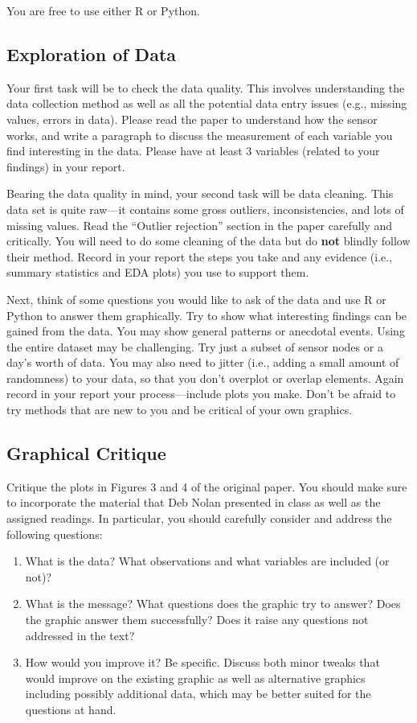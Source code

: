 \documentclass[11pt, oneside]{article}   	%
\begin{document}
You are free to use either R or Python.

\subsection*{Exploration of Data}

Your first task will be to check the data quality.  This involves understanding
the data collection method as well as all the potential data entry issues
(e.g., missing values, errors in data). Please read the paper to understand how
the sensor works, and write a paragraph to discuss the measurement of each
variable you find interesting in the data.  Please have at least 3 variables
(related to your findings) in your report.

Bearing the data quality in mind, your second task will be data cleaning. This
data set is quite raw---it contains some gross outliers, inconsistencies, and
lots of missing values. Read the ``Outlier rejection'' section in the paper
carefully and critically.  You will need to do some cleaning of the data but do
\textbf{not} blindly follow their method. Record in your report the steps you
take and any evidence (i.e., summary statistics and EDA plots) you use to
support them.

Next, think of some questions you would like to ask of the data and use R or
Python to answer them graphically. Try to show what interesting findings can be
gained from the data. You may show general patterns or anecdotal events.  Using
the entire dataset may be challenging. Try just a subset of sensor nodes or a
day's worth of data. You may also need to jitter (i.e., adding a small amount
of randomness) to your data, so that you don't overplot or overlap elements.
Again record in your report your process---include plots you make. Don't be
afraid to try methods that are new to you and be critical of your own graphics.

\subsection*{Graphical Critique}

Critique the plots in Figures 3 and 4 of the original paper. You should
make sure to incorporate the material that Deb Nolan presented in class as well
as the assigned readings.  In particular, you should carefully consider and
address the following questions:

\begin{enumerate}
\item What is the data?  What observations and what variables are included
  (or not)?
\item What is the message? What questions does the graphic try to answer?
  Does the graphic answer them successfully? Does it raise any questions not
  addressed in the text?
\item How would you improve it?  Be specific. Discuss both minor tweaks that
  would improve on the existing graphic as well as alternative graphics
  including possibly additional data, which may be better suited for the
  questions at hand.
\end{enumerate}
\end{document}
